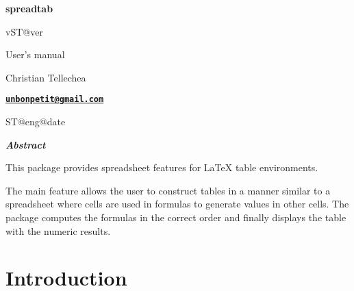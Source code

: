 \documentclass[a4paper,10pt]{article}
\newcommand\ST{\textsf{spreadtab}\xspace}
\begin{document}
\parindent0pt\pagestyle{fancy}
\begin{titlepage}
	\null\par\vfill
	\begin{center}
		\begin{minipage}{0.75\linewidth}
			\begin{center}
				\Huge\bfseries \ST\par\vspace{5pt}
				\small v\csname ST@ver\endcsname\par\vspace{25pt}
				\normalsize User's manual
			\end{center}
		\end{minipage}
	\end{center}
	\vspace{1cm}
	\begin{center}
		Christian {\sc Tellechea}\par\small
		\href{mailto:unbonpetit@gmail.com}{\texttt{\textbf{unbonpetit@gmail.com}}}\par\vspace{5pt}
		\csname ST@eng@date\endcsname
	\end{center}
	\vfill
	\begin{center}
		\begin{minipage}{0.8\linewidth}
			\noindent\hrulefill\par
			\hfill\textbf{\textit{Abstract}}\hfill{}\medskip\par\footnotesize
				This package provides spreadsheet features for \LaTeX{} table environments.\par\medskip
				The main feature allows the user to construct tables in a manner similar to a spreadsheet where cells are used in formulas to generate values in other cells. The package computes the formulas in the correct order and finally displays the table with the numeric results.\par
			\hrulefill
		\end{minipage}
	\end{center}
\vfill{}
\end{titlepage}

\tableofcontents\newpage
\parskip\medskipamount
\section{Introduction}
\end{document}
